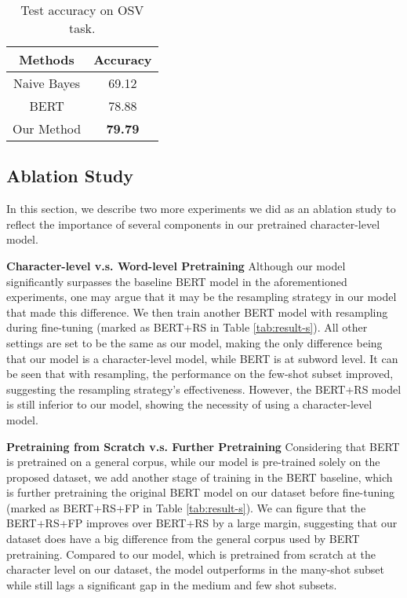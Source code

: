 \documentclass{article}
\begin{document}
\begin{table}[t]
    \centering
    \begin{tabular}{cc}
    \toprule
       Methods  &  Accuracy \\ \midrule
       Naive Bayes  &  69.12   \\
       BERT  &  78.88 \\
Our Method  &  \textbf{79.79}  \\
      \bottomrule
    \end{tabular}
    \caption{Test accuracy on OSV task.}
    \label{tab:task3}
\end{table}

\subsection{Ablation Study}
In this section, we describe two more experiments we did as an ablation study to reflect the importance of several components in our pretrained character-level model. 

\textbf{Character-level v.s. Word-level Pretraining}
Although our model significantly surpasses the baseline BERT model in the aforementioned experiments, one may argue that it may be the resampling strategy in our model that made this difference. We then train another BERT model with resampling during fine-tuning (marked as BERT+RS in Table \ref{tab:result-s}). All other settings are set to be the same as our model, making the only difference being that our model is a character-level model, while BERT is at subword level. It can be seen that with resampling, the performance on the few-shot subset improved, suggesting the resampling strategy's effectiveness. However, the BERT+RS model is still inferior to our model, showing the necessity of using a character-level model. 




\textbf{Pretraining from Scratch v.s. Further Pretraining}
Considering that BERT is pretrained on a general corpus, while our model is pre-trained solely on the proposed dataset, we add another stage of training in the BERT baseline, which is further pretraining the original BERT model on our dataset before fine-tuning (marked as BERT+RS+FP in Table \ref{tab:result-s}). We can figure that the BERT+RS+FP improves over BERT+RS by a large margin, suggesting that our dataset does have a big difference from the general corpus used by BERT pretraining. Compared to our model, which is pretrained from scratch at the character level on our dataset, the model outperforms in the many-shot subset while still lags a significant gap in the medium and few shot subsets. 
\end{document}
